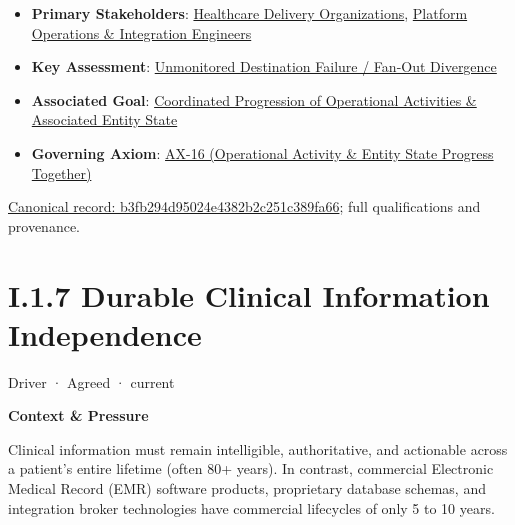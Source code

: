 \begin{itemize}


\item \textbf{Primary Stakeholders}: \href{\detokenize{../../../../../docs/markdown/01-motivation/stakeholders/enterprise-stakeholders.md}}{Healthcare Delivery Organizations}, \href{\detokenize{../../../../../docs/markdown/01-motivation/stakeholders/enterprise-stakeholders.md}}{Platform Operations \& Integration Engineers}

\item \textbf{Key Assessment}: \href{\detokenize{../../../../../docs/markdown/01-motivation/drivers-assessments/assessments.md}}{Unmonitored Destination Failure / Fan-Out Divergence}

\item \textbf{Associated Goal}: \href{\detokenize{../../../../../docs/markdown/01-motivation/goals-outcomes/strategic-goals.md}}{Coordinated Progression of Operational Activities \& Associated Entity State}

\item \textbf{Governing Axiom}: \hyperref[element:de7e90f46127455a9ec9ad3b9b48ba54]{AX-16 (Operational Activity \& Entity State Progress Together)}

\end{itemize}

{\footnotesize \href{../../../../continuum/motivation/driver/b3fb294d95024e4382b2c251c389fa66.md}{Canonical record: b3fb294d95024e4382b2c251c389fa66}; full qualifications and provenance.}\par
\section*{I.1.7 Durable Clinical Information Independence}
\label{navigation:I.1.7}

\label{element:3d81912dd8c94603ba0e10c98b7a62d8}
{\small Driver · Agreed · current}\par

\par\medskip\textbf{Context \& Pressure}\par


Clinical information must remain intelligible, authoritative, and actionable across a patient's entire lifetime (often 80+ years). In contrast, commercial Electronic Medical Record (EMR) software products, proprietary database schemas, and integration broker technologies have commercial lifecycles of only 5 to 10 years.



